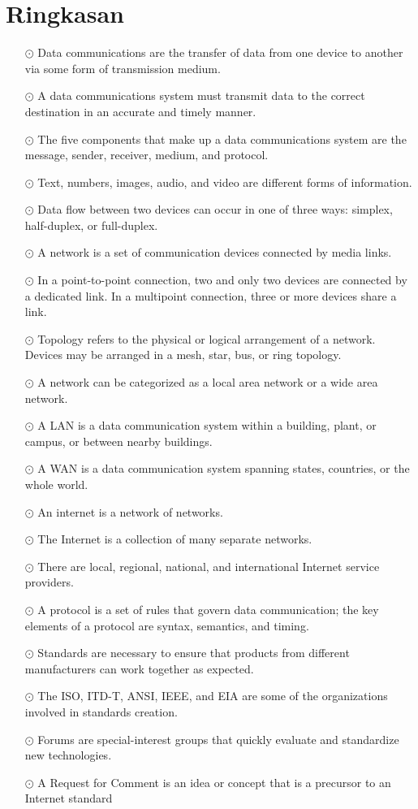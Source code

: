 \section{Ringkasan}
\begin{itemize}
  \item[$\odot$] Data communications are the transfer of data from one device to another via some form of transmission medium.
  \item[$\odot$] A data communications system must transmit data to the correct destination in an accurate and timely manner. 
  \item[$\odot$] The five components that make up a data communications system are the message, sender, receiver, medium, and protocol. 
  \item[$\odot$] Text, numbers, images, audio, and video are different forms of information. 
  \item[$\odot$] Data flow between two devices can occur in one of three ways: simplex, half-duplex, or full-duplex. 
  \item[$\odot$] A network is a set of communication devices connected by media links. 
  \item[$\odot$] In a point-to-point connection, two and only two devices are connected by a dedicated link. In a multipoint connection, three or more devices share a link. 
  \item[$\odot$] Topology refers to the physical or logical arrangement of a network. Devices may be arranged in a mesh, star, bus, or ring topology. 
  \item[$\odot$] A network can be categorized as a local area network or a wide area network. 
  \item[$\odot$] A LAN is a data communication system within a building, plant, or campus, or between nearby buildings. 
  \item[$\odot$] A WAN is a data communication system spanning states, countries, or the whole world. 
  \item[$\odot$] An internet is a network of networks. 
  \item[$\odot$] The Internet is a collection of many separate networks. 
  \item[$\odot$] There are local, regional, national, and international Internet service providers. 
  \item[$\odot$] A protocol is a set of rules that govern data communication; the key elements of a protocol are syntax, semantics, and timing.
  \item[$\odot$] Standards are necessary to ensure that products from different manufacturers can work together as expected. 
  \item[$\odot$] The ISO, ITD-T, ANSI, IEEE, and EIA are some of the organizations involved in standards creation. 
  \item[$\odot$] Forums are special-interest groups that quickly evaluate and standardize new technologies. 
  \item[$\odot$] A Request for Comment is an idea or concept that is a precursor to an Internet standard
\end{itemize}

